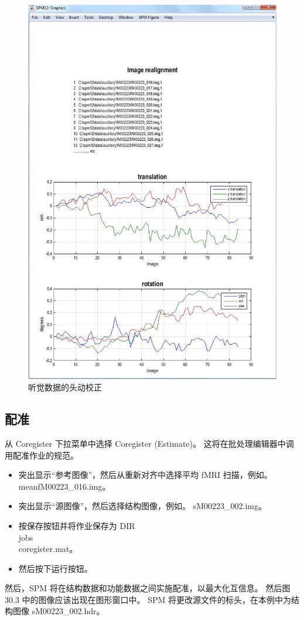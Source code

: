 \begin{figure}[htbp]
	\centering
	\includegraphics[width=0.6\linewidth]{part7/figs/fig_30_2}
	\caption{听觉数据的头动校正}
	\label{realignment}
\end{figure}

\subsection{配准}

从 Coregister 下拉菜单中选择 Coregister (Estimate)。 这将在批处理编辑器中调用配准作业的规范。

\begin{itemize}
	\item 突出显示“参考图像”，然后从重新对齐中选择平均 fMRI 扫描，例如。 meanfM00223\_016.img。
	
	\item 突出显示“源图像”，然后选择结构图像，例如。 sM00223\_002.img。
	
	\item 按保存按钮并将作业保存为 DIR\\jobs\\coregister.mat。
	
	\item 然后按下运行按钮。
\end{itemize}


然后，SPM 将在结构数据和功能数据之间实施配准，以最大化互信息。 然后图 30.3 中的图像应该出现在图形窗口中。 SPM 将更改源文件的标头，在本例中为结构图像 sM00223\_002.hdr。

